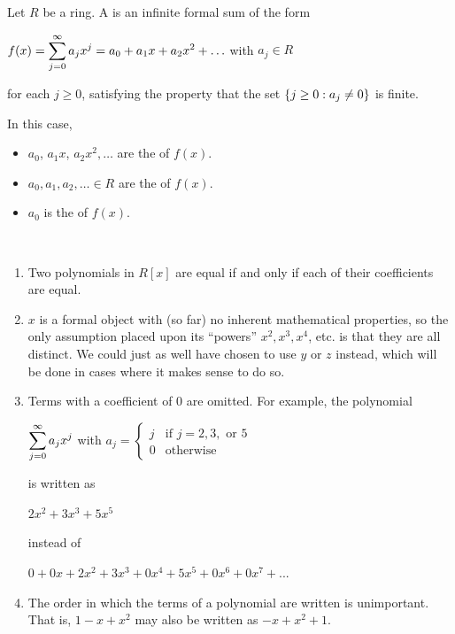 \documentclass[11pt,fleqn,dvipsnames,usenames]{article}
\newcommand{\p}{\noindent}
\begin{document}
\begin{definition}\label{polynomialdefinition}
Let $R$ be a ring.  A  is an infinite formal sum of the form
\begin{center}
$f(x) = \displaystyle\sum\limits_{j=0}^{\infty}a_{j}x^{j} = a_{0} + a_{1}x + a_{2}x^{2} + \ldots$ with $a_{j}\in R$
\end{center}
for each $j\geq 0$, satisfying the property that the set $\left\{j\geq 0:a_{j}\neq 0\right\}$ is finite.
\end{definition}
%
\terminology In this case,
\begin{itemize}
\item $a_{0}$, $a_{1}x$, $a_{2}x^{2}, \ldots$ are the  of $f(x)$.
\item $a_{0}, a_{1}, a_{2}, \ldots \in R$ are the  of $f(x)$.
\item $a_{0}$ is the  of $f(x)$.
\end{itemize}
%
\begin{remarks}~
\begin{enumerate}[(1)]
\item Two polynomials in $R[x]$ are equal if and only if each of their coefficients are equal.
\item $x$ is a formal object with (so far) no inherent mathematical properties, so the only assumption placed upon its ``powers'' $x^{2}, x^{3}, x^{4}$, etc. is that they are all distinct.  We could just as well have chosen to use $y$ or $z$ instead, which will be done in cases where it makes sense to do so.
\item Terms with a coefficient of $0$ are omitted.  For example, the polynomial
\begin{center}
$\displaystyle\sum\limits_{j=0}^{\infty}a_{j}x^{j}$ with $a_{j} = \begin{cases}j & \text{if } j = 2, 3,\text{ or }5\\0 & \text{otherwise}\end{cases}$
\end{center}
\p is written as
\begin{center}
$2x^2 + 3x^3 + 5x^{5}$
\end{center}
\p instead of
\begin{center}
$0 + 0x + 2x^2 + 3x^3 + 0x^4 + 5x^5 + 0x^6 + 0x^7 + ...$
\end{center}
\vsp

\item The order in which the terms of a polynomial are written is unimportant.  That is, $1 - x + x^2$ may also be written as $-x + x^2 + 1$.
\end{enumerate}
\end{remarks}
\end{document}
